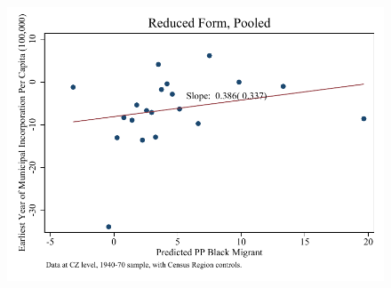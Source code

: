 \documentclass{article}
\begin{document}
\clearpage
\begin{figure}
\centering
\includegraphics{figures/simplefigs/pooled_cgoodman_full_pc_C3_rf.pdf}
\end{figure}
\clearpage
\end{document}

